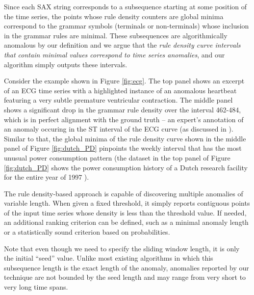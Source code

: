\documentclass{sig-alternate}
\begin{document}
Since each SAX string corresponds to a subsequence starting at some position of the time series, the points whose rule density counters are global minima correspond to the grammar symbols (terminals or non-terminals) whose inclusion in the grammar rules are minimal. These subsequences are algorithmically anomalous by our definition and we argue that the \textit{rule density curve intervals that contain minimal values correspond to time series anomalies}, and our algorithm simply outputs these intervals.

Consider the example shown in Figure \ref{fig:ecg}. The top panel shows an excerpt of an ECG time series with a highlighted instance of an anomalous heartbeat featuring a very subtle premature ventricular contraction. The middle panel shows a significant drop in the grammar rule density over the interval 462-484, which is in perfect alignment with the ground truth -- an expert's annotation of an anomaly occuring in the ST interval of the ECG curve (as discussed in \cite{hot_sax}). Similar to that, the global minima of the rule density curve shown in the middle panel of Figure \ref{fig:dutch_PD} pinpoints the weekly interval that has the most unusual power consumption pattern (the dataset in the top panel of Figure \ref{fig:dutch_PD} shows the power consumption history of a Dutch research facility for the entire year of 1997 \cite{dutchpd}).


The rule density-based approach is capable of discovering multiple anomalies of variable length.  When given a fixed threshold, it simply reports contiguous points of the input time series whose density is less than the threshold value. If needed, an additional ranking criterion can be defined, such as a minimal anomaly length or a statistically sound criterion based on probabilities.

Note that even though we need to specify the sliding window length, it is only the initial ``seed'' value. Unlike most existing algorithms in which this subsequence length is the exact length of the anomaly, anomalies reported by our technique are not bounded by the seed length and may range from very short to very long time spans.
\end{document}

